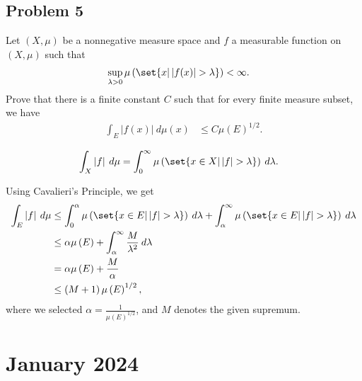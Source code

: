 \documentclass[10pt]{mypackage}
\begin{document}
\subsection{Problem 5}%
\begin{problem}
  Let $\left( X,\mu \right)$ be a nonnegative measure space and $f$ a measurable function on $\left( X,\mu \right)$ such that
  \begin{align*}
    \sup_{\lambda > 0} \mu\left( \set{x | \left\vert f(x) \right\vert > \lambda} \right) &< \infty.
  \end{align*}
  Prove that there is a finite constant $C$ such that for every finite measure subset, we have
  \begin{align*}
    \int_{E}^{} \left\vert f(x) \right\vert\:d\mu(x) &\leq C\mu\left( E \right)^{1/2}.
  \end{align*}
\end{problem}
\begin{lemma}
  \begin{align*}
    \int_{X}^{} \left\vert f \right\vert\:d\mu &= \int_{0}^{\infty} \mu\left( \set{x\in X | \left\vert f \right\vert > \lambda} \right)\:d\lambda.
  \end{align*}
\end{lemma}
Using Cavalieri's Principle, we get
\begin{align*}
  \int_{E}^{} \left\vert f \right\vert\:d\mu &\leq \int_{0}^{\alpha} \mu\left( \set{x\in E | \left\vert f \right\vert > \lambda} \right)\:d\lambda + \int_{\alpha}^{\infty} \mu\left( \set{x\in E | \left\vert f \right\vert > \lambda} \right)\:d\lambda\\
                                             &\leq \alpha\mu\left( E \right) + \int_{\alpha}^{\infty} \frac{M}{\lambda^2}\:d\lambda\\
                                             &= \alpha\mu\left( E \right) + \frac{M}{\alpha}\\
                                             &\leq \left( M+1 \right)\mu\left( E \right)^{1/2},
\end{align*}
where we selected $\alpha = \frac{1}{\mu\left( E \right)^{1/2}}$, and $M$ denotes the given supremum.
\section{January 2024}%
\end{document}
